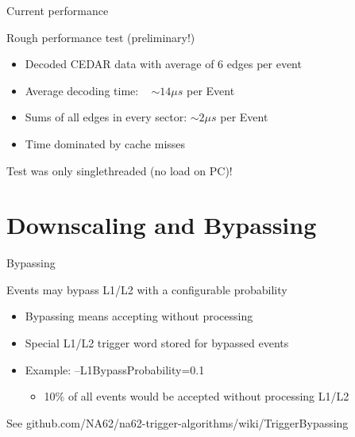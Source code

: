 \begin{frame}{Current performance}{}
	\begin{block}{Rough performance test (preliminary!)}
		\begin{itemize}
	  		\item Decoded CEDAR data with average of 6 edges per event
	  		\item Average decoding time: ~	$\sim 14 \mu s$ per Event
	  		\item Sums of all edges in every sector: $\sim 2 \mu s$ per Event
	  		\item Time dominated by cache misses
		\end{itemize}
	\end{block}
	Test was only singlethreaded (no load on PC)!
\end{frame}

\section*{Downscaling and Bypassing}

\begin{frame}{Bypassing}{}
	\begin{block}{Events may bypass L1/L2 with a configurable probability}
		\begin{itemize}
		  	\item Bypassing means accepting without processing
		  	\item Special L1/L2 trigger word stored for bypassed events
	  		\item Example: --L1BypassProbability=0.1
	  		\begin{itemize}
	  			\item 10\% of all events would be accepted without processing L1/L2
	  		\end{itemize} 
		\end{itemize}
	\end{block}
	\vspace{0.5cm}
	See github.com/NA62/na62-trigger-algorithms/wiki/TriggerBypassing
\end{frame}

